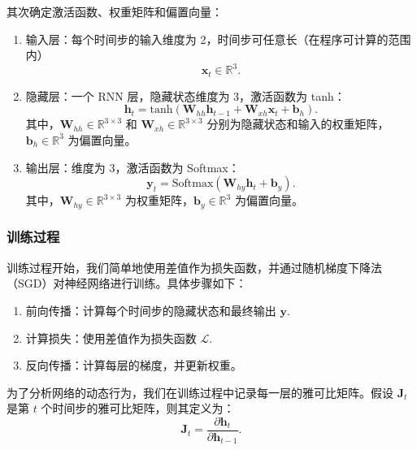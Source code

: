 其次确定激活函数、权重矩阵和偏置向量：

\begin{enumerate}

  \item 输入层：每个时间步的输入维度为 2，时间步可任意长（在程序可计算的范围内）
        \begin{equation}
          \mathbf{x}_t \in \mathbb{R}^{3}.
        \end{equation}

  \item 隐藏层：一个 RNN 层，隐藏状态维度为 3，激活函数为 tanh：
        \begin{equation}
          \mathbf{h}_t = \text{tanh}(\mathbf{W}_{hh} \mathbf{h}_{t-1} + \mathbf{W}_{xh} \mathbf{x}_t + \mathbf{b}_h).
        \end{equation}
        其中，\(\mathbf{W}_{hh} \in \mathbb{R}^{3 \times 3}\) 和 \(\mathbf{W}_{xh} \in \mathbb{R}^{3 \times 3}\) 分别为隐藏状态和输入的权重矩阵，\(\mathbf{b}_h \in \mathbb{R}^{3}\) 为偏置向量。

  \item 输出层：维度为 3，激活函数为 Softmax：
        \begin{equation}
          \mathbf{y}_t = \text{Softmax}(\mathbf{W}_{hy} \mathbf{h}_t + \mathbf{b}_y).
        \end{equation}
        其中，\(\mathbf{W}_{hy} \in \mathbb{R}^{3 \times 3}\) 为权重矩阵，\(\mathbf{b}_y \in \mathbb{R}^{3}\) 为偏置向量。

\end{enumerate}

\subsubsection{训练过程}\label{sec:rnn_training}

训练过程开始，我们简单地使用差值作为损失函数，并通过随机梯度下降法（SGD）对神经网络进行训练。具体步骤如下：

\begin{enumerate}
  \item 前向传播：计算每个时间步的隐藏状态和最终输出 \(\mathbf{y}\).
  \item 计算损失：使用差值作为损失函数 \(\mathcal{L}\).
  \item 反向传播：计算每层的梯度，并更新权重。
\end{enumerate}

为了分析网络的动态行为，我们在训练过程中记录每一层的雅可比矩阵。假设 \(\mathbf{J}_t\) 是第 \(t\) 个时间步的雅可比矩阵，则其定义为：
\begin{equation}
  \mathbf{J}_t = \frac{\partial \mathbf{h}_t}{\partial \mathbf{h}_{t-1}}.
\end{equation}

